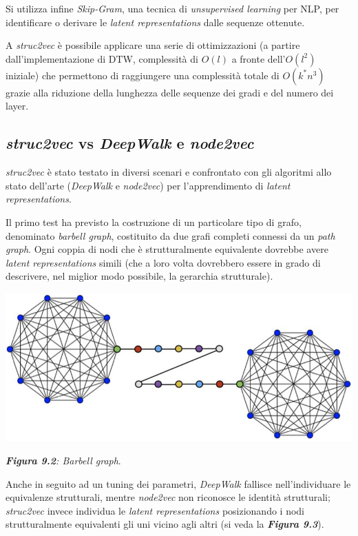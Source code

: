\documentclass[11pt]{article}
\begin{document}
Si utilizza infine \textit{Skip-Gram}, una tecnica di \textit{unsupervised learning} per NLP, per identificare o derivare le \textit{latent representations} dalle sequenze ottenute.

A \textit{struc2vec} è possibile applicare una serie di ottimizzazioni (a partire dall'implementazione di DTW, complessità di $O(l)$ a fronte dell'$O(l^2)$ iniziale) che permettono di raggiungere una complessità totale di $O(k^*n^3)$ grazie alla riduzione della lunghezza delle sequenze dei gradi e del numero dei layer.

\subsection{\textit{struc2vec} vs \textit{DeepWalk} e \textit{node2vec}}
\textit{struc2vec} è stato testato in diversi scenari e confrontato con gli algoritmi allo stato dell'arte (\textit{DeepWalk} e \textit{node2vec}) per l'apprendimento di \textit{latent representations}.

Il primo test ha previsto la costruzione di un particolare tipo di grafo, denominato \textit{barbell graph}, costituito da due grafi completi connessi da un \textit{path graph}. Ogni coppia di nodi che è strutturalmente equivalente dovrebbe avere \textit{latent representations} simili (che a loro volta dovrebbero essere in grado di descrivere, nel miglior modo possibile, la gerarchia strutturale).

\begin{center}
\includegraphics[scale=0.65]{struc6}

\begin{small}\textit{\textbf{Figura 9.2}: Barbell graph}.\end{small}
\end{center}

Anche in seguito ad un tuning dei parametri, \textit{DeepWalk} fallisce nell'individuare le equivalenze strutturali, mentre \textit{node2vec} non riconosce le identità strutturali; \textit{struc2vec} invece individua le \textit{latent representations} posizionando i nodi strutturalmente equivalenti gli uni vicino agli altri (si veda la \textit{\textbf{Figura 9.3}}).
\end{document}
